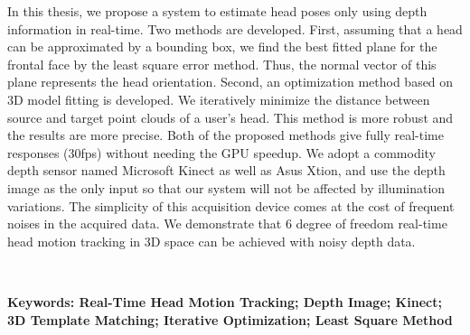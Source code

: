 \begin{abstractEN}
In this thesis, we propose a system to estimate head poses only using depth information in real-time. Two methods are developed. First, assuming that a head can be approximated by a bounding box, we find the best fitted plane for the frontal face by the least square error method. Thus, the normal vector of this plane represents the head orientation. Second, an optimization method based on 3D model fitting is developed. We iteratively minimize the distance between source and target point clouds of a user's head. This method is more robust and the results are more precise. Both of the proposed methods give fully real-time responses (30fps) without needing the GPU speedup. We adopt a commodity depth sensor named Microsoft Kinect as well as Asus Xtion, and use the depth image as the only input so that our system will not be affected by illumination variations. The simplicity of this acquisition device comes at the cost of frequent noises in the acquired data. We demonstrate that 6 degree of freedom real-time head motion tracking in 3D space can be achieved with noisy depth data.

　

\noindent\bf{Keywords: Real-Time Head Motion Tracking; Depth Image; Kinect; 3D Template Matching; Iterative Optimization; Least Square Method}

\end{abstractEN}

\begin{comment}



\keywords{Head Pose Estimation \and Depth Map \and Kinect \and Least Square Error Plane \and Optimization \and Gradient Decent Algorithm \and Nose Tracking}

\end{comment}
